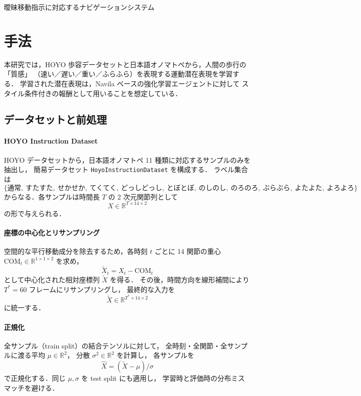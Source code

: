 \documentclass[a4paper,10pt]{jsarticle}
\begin{document}
\begin{center}
  {\LARGE 曖昧移動指示に対応するナビゲーションシステム}
\end{center}
\vspace{5truemm}

\section{手法}

本研究では，HOYO 歩容データセットと日本語オノマトペから，人間の歩行の「質感」
（速い／遅い／重い／ふらふら）を表現する運動潜在表現を学習する．
学習された潜在表現は，Navila ベースの強化学習エージェントに対して
スタイル条件付きの報酬として用いることを想定している．

\subsection{データセットと前処理}

\paragraph{HOYO Instruction Dataset}
HOYO データセットから，日本語オノマトペ 11 種類に対応するサンプルのみを抽出し，
簡易データセット \texttt{HoyoInstructionDataset} を構成する．
ラベル集合は
\[
\{\text{通常},\ \text{すたすた},\ \text{せかせか},\ \text{てくてく},\ 
\text{どっしどっし},\ \text{とぼとぼ},\ \text{のしのし},\ \text{のろのろ},\ 
\text{ぶらぶら},\ \text{よたよた},\ \text{よろよろ}\}
\]
からなる．各サンプルは時間長 $T$ の 2 次元関節列として
\[
X \in \mathbb{R}^{T \times 14 \times 2}
\]
の形で与えられる．

\paragraph{座標の中心化とリサンプリング}
空間的な平行移動成分を除去するため，各時刻 $t$ ごとに 14 関節の重心
$\mathrm{COM}_t \in \mathbb{R}^{1 \times 1 \times 2}$ を求め，
\[
\tilde{X}_t = X_t - \mathrm{COM}_t
\]
として中心化された相対座標列 $\tilde{X}$ を得る．
その後，時間方向を線形補間により $T^\ast = 60$ フレームにリサンプリングし，
最終的な入力を
\[
\tilde{X} \in \mathbb{R}^{T^\ast \times 14 \times 2}
\]
に統一する．

\paragraph{正規化}
全サンプル（train split）の結合テンソルに対して，
全時刻・全関節・全サンプルに渡る平均 $\mu \in \mathbb{R}^{2}$，
分散 $\sigma^2 \in \mathbb{R}^{2}$ を計算し，
各サンプルを
\[
\hat{X} = (\tilde{X} - \mu) / \sigma
\]
で正規化する．同じ $\mu, \sigma$ を test split にも適用し，
学習時と評価時の分布ミスマッチを避ける．
\end{document}
